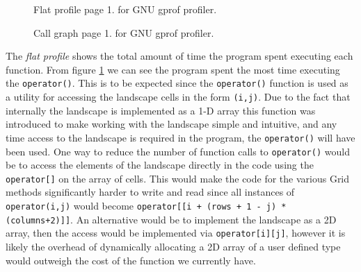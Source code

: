 \begin{figure}
\centering
{}
\caption{Flat profile page 1. for GNU gprof profiler.}
\label{fig:flatp}
\end{figure}

\begin{figure}
\centering
{}
\caption{Call graph page 1. for GNU gprof profiler.}
\label{fig:callg}
\end{figure}

The \textit{flat profile} shows the total amount of time the program spent executing each function. From figure \ref{fig:flatp} we can see the program spent the most time executing the \texttt{operator()}. This is to be expected since the \texttt{operator()} function is used as a utility for accessing the landscape cells in the form \texttt{(i,j)}. Due to the fact that internally the landscape is implemented as a 1-D array this function was introduced to make working with the landscape simple and intuitive, and any time access to the landscape is required in the program, the \texttt{operator()} will have been used. One way to reduce the number of function calls to \texttt{operator()} would be to access the elements of the landscape directly in the code using the \texttt{operator[]} on the array of cells. This would make the code for the various Grid methods significantly harder to write and read since all instances of \texttt{operator(i,j)} would become \texttt{operator[[i + (rows + 1 - j) * (columns+2)]]}. An alternative would be to implement the landscape as a 2D array, then the access would be implemented via \texttt{operator[i][j]}, however it is likely the overhead of dynamically allocating a 2D array of a user defined type would outweigh the cost of the function we currently have. \\

